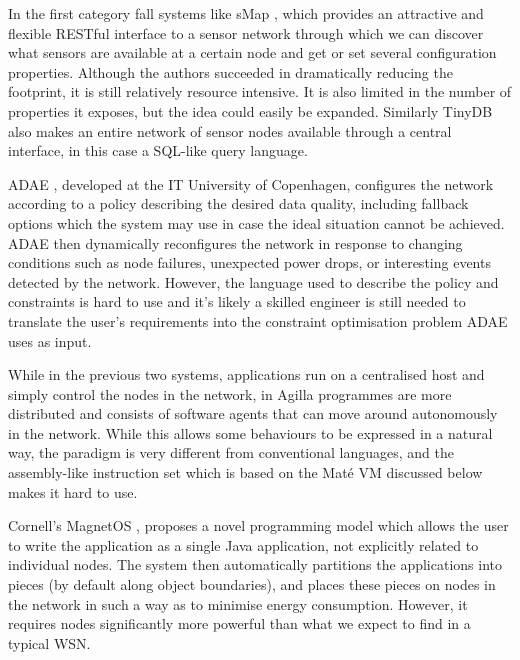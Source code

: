 In the first category fall systems like sMap \cite{DawsonHaggerty:2010eo}, which provides an attractive and flexible RESTful interface to a sensor network through which we can discover what sensors are available at a certain node and get or set several configuration properties. Although the authors succeeded in dramatically reducing the footprint, it is still relatively resource intensive. It is also limited in the number of properties it exposes, but the idea could easily be expanded. Similarly TinyDB \cite{Madden:2005tj} also makes an entire network of sensor nodes available through a central interface, in this case a SQL-like query language.

ADAE \cite{Chang:2010ek}, developed at the IT University of Copenhagen, configures the network according to a policy describing the desired data quality, including fallback options which the system may use in case the ideal situation cannot be achieved. ADAE then dynamically reconfigures the network in response to changing conditions such as node failures, unexpected power drops, or interesting events detected by the network. However, the language used to describe the policy and constraints is hard to use and it's likely a skilled engineer is still needed to translate the user's requirements into the constraint optimisation problem ADAE uses as input.

While in the previous two systems, applications run on a centralised host and simply control the nodes in the network, in Agilla \cite{Fok:2005bh} programmes are more distributed and consists of software agents that can move around autonomously in the network. While this allows some behaviours to be expressed in a natural way, the paradigm is very different from conventional languages, and the assembly-like instruction set which is based on the Maté VM \cite{Levis:2002ku} discussed below makes it hard to use.

Cornell's MagnetOS \cite{Liu:2005wsa}, proposes a novel programming model which allows the user to write the application as a single Java application, not explicitly related to individual nodes. The system then automatically partitions the applications into pieces (by default along object boundaries), and places these pieces on nodes in the network in such a way as to minimise energy consumption. However, it requires nodes significantly more powerful than what we expect to find in a typical WSN.

